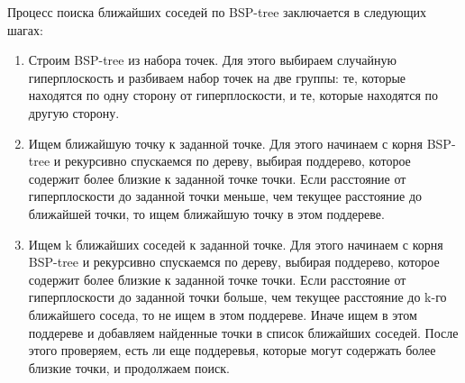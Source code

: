 Процесс поиска ближайших соседей по BSP-tree заключается в следующих шагах:
\begin{enumerate}
    \item Строим BSP-tree из набора точек. Для этого выбираем случайную гиперплоскость и разбиваем набор точек на две группы: те, которые находятся по одну сторону от гиперплоскости, и те, которые находятся по другую сторону.
    \item Ищем ближайшую точку к заданной точке. Для этого начинаем с корня BSP-tree и рекурсивно спускаемся по дереву, выбирая поддерево, которое содержит более близкие к заданной точке точки. Если расстояние от гиперплоскости до заданной точки меньше, чем текущее расстояние до ближайшей точки, то ищем ближайшую точку в этом поддереве.
    \item Ищем k ближайших соседей к заданной точке. Для этого начинаем с корня BSP-tree и рекурсивно спускаемся по дереву, выбирая поддерево, которое содержит более близкие к заданной точке точки. Если расстояние от гиперплоскости до заданной точки больше, чем текущее расстояние до k-го ближайшего соседа, то не ищем в этом поддереве. Иначе ищем в этом поддереве и добавляем найденные точки в список ближайших соседей. После этого проверяем, есть ли еще поддеревья, которые могут содержать более близкие точки, и продолжаем поиск.
\end{enumerate}
